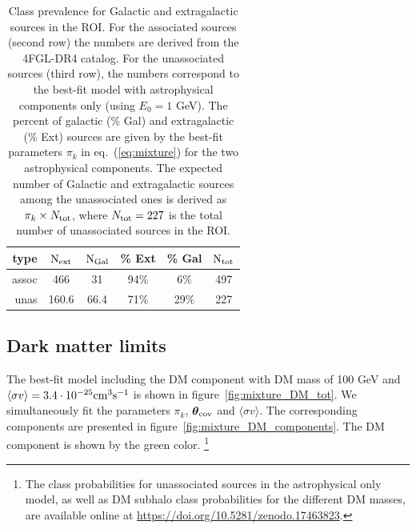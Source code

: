 \documentclass[12pt, a4paper]{article}
\newcommand{\btheta}{\boldsymbol{\theta}}
\newcommand{\sigmav}{\langle \sigma v \rangle}
\begin{document}
\begin{table}[t]
\centering
\begin{tabular}{|rccccc|}
\toprule
type & $\rm N_{ext}$ & $\rm N_{Gal}$ & \% Ext & \% Gal & $\rm N_{tot}$\\
\midrule
assoc & 466 & 31 & 94\% & 6\% & 497\\
unas & 160.6 & 66.4 & 71\% & 29\% & 227\\
\bottomrule
\end{tabular}
\caption{Class prevalence for Galactic and extragalactic sources in the ROI. 
For the associated sources (second row) the numbers are derived from the 4FGL-DR4 catalog. 
For the unassociated sources (third row), the numbers correspond to the best-fit model with astrophysical components only (using $E_0 = 1$ GeV). 
The percent of galactic (\% Gal) and extragalactic (\% Ext) sources are given by the best-fit parameters $\pi_k$ in eq.~(\ref{eq:mixture}) for the two astrophysical components.
The expected number of Galactic and extragalactic sources among the unassociated ones is derived as $\pi_k \times N_{\rm tot}$, where $N_{\rm tot} = 227$ is the total number of unassociated sources in the ROI.
}
\label{tab:class_prevalence_astro}
\end{table}


\subsection{Dark matter limits}
\label{sec:dm-limits}

The best-fit model including the DM component with DM mass of 100 GeV and $\sigmav=3.4 \cdot 10^{-25} {\rm cm}^3{\rm s}^{-1}$ is shown in figure~\ref{fig:mixture_DM_tot}.
We simultaneously fit the parameters $\pi_k$, $\btheta_{\rm cov}$ and $\sigmav$.
The corresponding components are presented in figure~\ref{fig:mixture_DM_components}.
The DM component is shown by the green color.%
\footnote{The class probabilities for unassociated sources in the astrophysical only model, as well as DM subhalo class probabilities for the different DM masses, are available online at \href{https://doi.org/10.5281/zenodo.17463823}{https://doi.org/10.5281/zenodo.17463823}.
}
\end{document}
